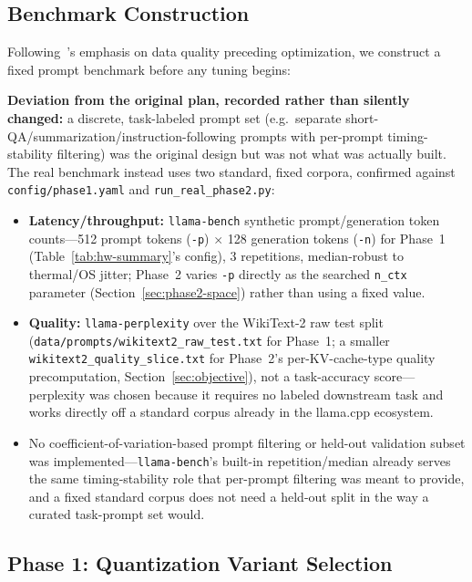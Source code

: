 \documentclass[journal]{IEEEtran}
\begin{document}
\subsection{Benchmark Construction}

Following~\cite{ref11}'s emphasis on data quality preceding optimization, we construct a fixed prompt benchmark before any tuning begins:

\textbf{Deviation from the original plan, recorded rather than silently changed:} a discrete, task-labeled prompt set (e.g.\ separate short-QA/summarization/instruction-following prompts with per-prompt timing-stability filtering) was the original design but was not what was actually built. The real benchmark instead uses two standard, fixed corpora, confirmed against \texttt{config/phase1.yaml} and \texttt{run\_real\_phase2.py}:
\begin{itemize}
  \item \textbf{Latency/throughput:} \texttt{llama-bench} synthetic prompt/generation token counts---512 prompt tokens (\texttt{-p}) $\times$ 128 generation tokens (\texttt{-n}) for Phase~1 (Table~\ref{tab:hw-summary}'s config), 3 repetitions, median-robust to thermal/OS jitter; Phase~2 varies \texttt{-p} directly as the searched \texttt{n\_ctx} parameter (Section~\ref{sec:phase2-space}) rather than using a fixed value.
  \item \textbf{Quality:} \texttt{llama-perplexity} over the WikiText-2 raw test split (\texttt{data/prompts/wikitext2\_raw\_test.txt} for Phase~1; a smaller \texttt{wikitext2\_quality\_slice.txt} for Phase~2's per-KV-cache-type quality precomputation, Section~\ref{sec:objective}), not a task-accuracy score---perplexity was chosen because it requires no labeled downstream task and works directly off a standard corpus already in the llama.cpp ecosystem.
  \item No coefficient-of-variation-based prompt filtering or held-out validation subset was implemented---\texttt{llama-bench}'s built-in repetition/median already serves the same timing-stability role that per-prompt filtering was meant to provide, and a fixed standard corpus does not need a held-out split in the way a curated task-prompt set would.
\end{itemize}

\subsection{Phase 1: Quantization Variant Selection}
\label{sec:phase1}
\end{document}
